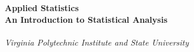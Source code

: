 
\begin{titlepage}

{~ \\[5cm] }

\noindent \HRule \\[0.4cm]
{ \Huge \bfseries Applied Statistics \\[0.4cm] }
{ \huge \bfseries An Introduction to Statistical Analysis \\ }
\HRule \\[0.4cm]

{ \large \emph{Virginia Polytechnic Institute and State University} }
\end{titlepage}